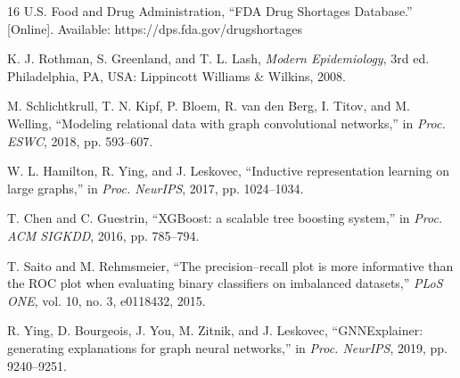 \documentclass[conference,letterpaper]{IEEEtran}
\begin{document}
\begin{thebibliography}{16}
 U.S. Food and Drug Administration, ``FDA Drug Shortages
Database.'' [Online]. Available: https://dps.fda.gov/drugshortages

 K. J. Rothman, S. Greenland, and T. L. Lash, \emph{Modern
Epidemiology}, 3rd ed. Philadelphia, PA, USA: Lippincott Williams \& Wilkins,
2008.

 M. Schlichtkrull, T. N. Kipf, P. Bloem, R. van den Berg, I.
Titov, and M. Welling, ``Modeling relational data with graph convolutional
networks,'' in \emph{Proc. ESWC}, 2018, pp. 593--607.

 W. L. Hamilton, R. Ying, and J. Leskovec, ``Inductive
representation learning on large graphs,'' in \emph{Proc. NeurIPS}, 2017, pp.
1024--1034.

 T. Chen and C. Guestrin, ``XGBoost: a scalable tree boosting
system,'' in \emph{Proc. ACM SIGKDD}, 2016, pp. 785--794.

 T. Saito and M. Rehmsmeier, ``The precision--recall plot is more
informative than the ROC plot when evaluating binary classifiers on imbalanced
datasets,'' \emph{PLoS ONE}, vol. 10, no. 3, e0118432, 2015.

 R. Ying, D. Bourgeois, J. You, M. Zitnik, and J.
Leskovec, ``GNNExplainer: generating explanations for graph neural networks,'' in
\emph{Proc. NeurIPS}, 2019, pp. 9240--9251.

\end{thebibliography}
\end{document}
